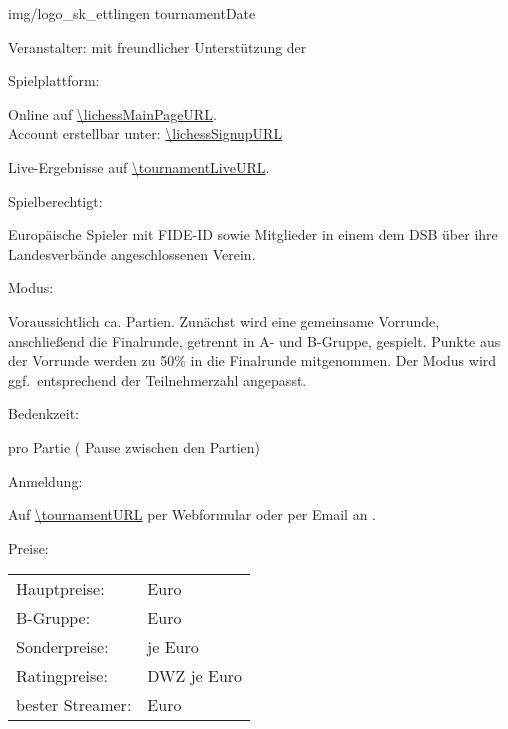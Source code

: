 \documentclass[paper=a4, fontsize=10pt]{scrartcl}
\begin{document}
                 {img/logo_sk_ettlingen}
                 {\tournamentName}
                 {tournamentDate}


\begin{basedescript}{\desclabelstyle{\multilinelabel}\desclabelwidth{10em}}
                 

\item[Veranstalter:]
  \organizerName{} mit freundlicher Unterstützung der \sponsorName{}

\item[Spielplattform:]

  Online auf \url{\lichessMainPageURL}. \\
  Account erstellbar unter: \url{\lichessSignupURL}

  Live-Ergebnisse auf \url{\tournamentLiveURL}.

\item[Spielberechtigt:]

  Europäische Spieler mit FIDE-ID sowie Mitglieder in einem dem DSB
  über ihre Landesverbände angeschlossenen Verein.

\item[Modus:]

  Voraussichtlich ca. \expectedTotalGames{} Partien. Zunächst wird
  eine gemeinsame Vorrunde, anschließend die Finalrunde, getrennt in
  A- und B-Gruppe, gespielt. Punkte aus der Vorrunde werden zu 50\% in
  die Finalrunde mitgenommen. Der Modus wird ggf.\ entsprechend der
  Teilnehmerzahl angepasst.

\item[Bedenkzeit:]

  \timePerGame{} pro Partie (\pauseBetweenGames{} Pause zwischen den
  Partien)

\item[Anmeldung:]

  Auf \url{\tournamentURL} per Webformular oder per Email an
  \email{\tournamentEmail}.

\item[Preise:]

  \hspace{2em}\begin{tabular}[t]{ll}
    Hauptpreise:       &  \is{/}{\prizesTournamentA} Euro \\
    B-Gruppe:          &  \is{/}{\prizesTournamentB} Euro \\
    Sonderpreise:      &  \is{/}{\specialPrizesCateries} je \specialPrizes{} Euro \\
    Ratingpreise:      &  DWZ \is{/}{\ratingPriceCategories} je \ratingPrices{} Euro \\
    bester Streamer:   &  \specialPrizes{} Euro
  \end{tabular}


\end{basedescript}
\end{document}
